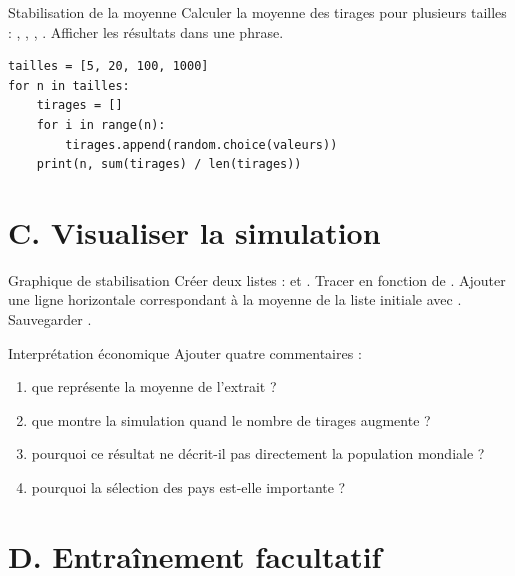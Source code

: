 \documentclass[11pt,a4paper]{article}
\begin{document}
\begin{mandatoryexercise}{Stabilisation de la moyenne}
Calculer la moyenne des tirages pour plusieurs tailles : , , , . Afficher les résultats dans une phrase.
\begin{lstlisting}
tailles = [5, 20, 100, 1000]
for n in tailles:
    tirages = []
    for i in range(n):
        tirages.append(random.choice(valeurs))
    print(n, sum(tirages) / len(tirages))
\end{lstlisting}
\end{mandatoryexercise}

\section*{C. Visualiser la simulation}

\begin{mandatoryexercise}{Graphique de stabilisation}
Créer deux listes :  et . Tracer  en fonction de . Ajouter une ligne horizontale correspondant à la moyenne de la liste initiale avec . Sauvegarder .
\end{mandatoryexercise}

\begin{mandatoryexercise}{Interprétation économique}
Ajouter quatre commentaires :
\begin{enumerate}
  \item que représente la moyenne de l'extrait ?
  \item que montre la simulation quand le nombre de tirages augmente ?
  \item pourquoi ce résultat ne décrit-il pas directement la population mondiale ?
  \item pourquoi la sélection des pays est-elle importante ?
\end{enumerate}
\end{mandatoryexercise}

\section*{D. Entraînement facultatif}
\end{document}
